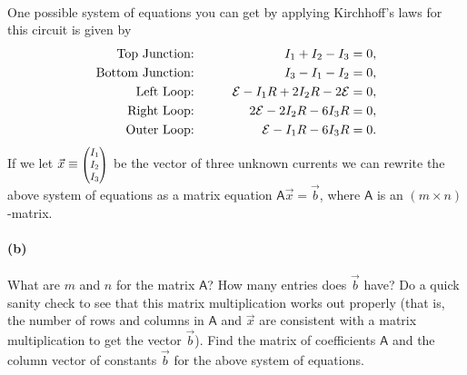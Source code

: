 \documentclass{article}
\begin{document}
\paragraph{}
One possible system of equations you can get by applying Kirchhoff's laws for this circuit is given by
	\begin{alignat*}{2}
		\mbox{Top Junction:}&\qquad& I_{1}+I_{2}-I_{3} &=0,\\
		\mbox{Bottom Junction:}&\qquad& I_{3}-I_{1}-I_{2} &=0,\\
		\mbox{Left Loop:}&\qquad& \mathcal{E} - I_{1}R + 2I_{2}R - 2\mathcal{E} &=0,\\
		\mbox{Right Loop:}&\qquad& 2\mathcal{E} - 2I_{2}R - 6I_{3}R &=0,\\
		\mbox{Outer Loop:}&\qquad& \mathcal{E} - I_{1}R - 6I_{3}R &=0.
	\end{alignat*}
If we let $\vec{x} \equiv \smthreevect{I_{1}}{I_{2}}{I_{3}}$ be the vector of three unknown currents we can rewrite the above system of equations as a matrix equation 
$\mathsf{A}\vec{x}=\vec{b}$, where $\mathsf{A}$ is an $(m\times n)$-matrix.


\paragraph{(b)}
What are $m$ and $n$ for the matrix $\mathsf{A}$?  How many entries does $\vec{b}$ have?  Do a quick sanity check to see that this matrix
multiplication works out properly (that is, the number of rows and columns in $\mathsf{A}$ and $\vec{x}$ are consistent with a matrix multiplication to get
the vector $\vec{b}$).  Find the matrix of coefficients $\mathsf{A}$ and the column vector of constants $\vec{b}$ for the above system of equations.
\end{document}
